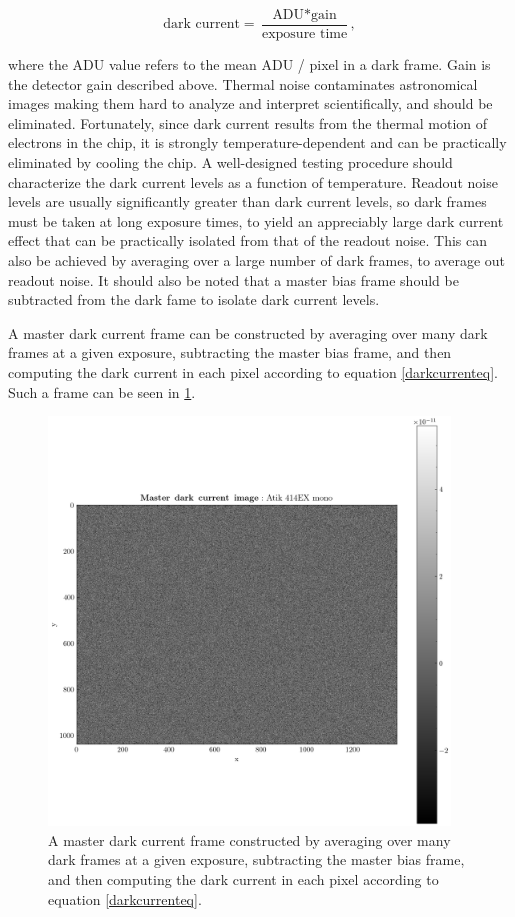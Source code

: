 \documentclass[../main.tex]{subfiles}
\begin{document}
	\begin{equation}\label{darkcurrenteq}
		\text{dark current} = \frac{\text{ADU} * \text{gain}}{\text{exposure time}},
	\end{equation}
	
	where the ADU value refers to the mean ADU / pixel in a dark frame. Gain is the detector gain described above. Thermal noise contaminates astronomical images making them hard to analyze and interpret scientifically, and should be eliminated. Fortunately, since dark current results from the thermal motion of electrons in the chip, it is strongly temperature-dependent and can be practically eliminated by cooling the chip. A well-designed testing procedure should characterize the dark current levels as a function of temperature. Readout noise levels are usually significantly greater than dark current levels, so dark frames must be taken at long exposure times, to yield an appreciably large dark current effect that can be practically isolated from that of the readout noise. This can also be achieved by averaging over a large number of dark frames, to average out readout noise. It should also be noted that a master bias frame should be subtracted from the dark fame to isolate dark current levels. 
	
	A master dark current frame can be constructed by averaging over many dark frames at a given exposure, subtracting the master bias frame, and then computing the dark current in each pixel according to equation \ref{darkcurrenteq}. Such a frame can be seen in \ref{fig:masterdarkcurrent}.
	\begin{figure}[h!]
		\centering
		\includegraphics[width	=0.95\textwidth]{master_dark.png}
		\caption{A master dark current frame constructed by averaging over many dark frames at a given exposure, subtracting the master bias frame, and then computing the dark current in each pixel according to equation \ref{darkcurrenteq}.}
		\label{fig:masterdarkcurrent}
	\end{figure}
	
\end{document}

